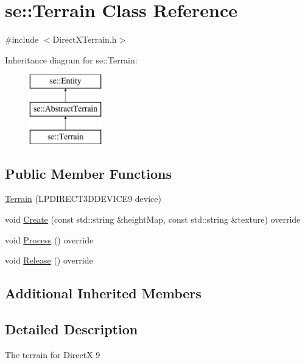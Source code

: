 \hypertarget{classse_1_1_terrain}{}\section{se\+:\+:Terrain Class Reference}
\label{classse_1_1_terrain}


{\ttfamily \#include $<$Direct\+X\+Terrain.\+h$>$}

Inheritance diagram for se\+:\+:Terrain\+:\begin{figure}[H]
\begin{center}
\leavevmode
\includegraphics[height=3.000000cm]{classse_1_1_terrain}
\end{center}
\end{figure}
\subsection*{Public Member Functions}
\begin{DoxyCompactItemize}
\item 
\mbox{\hyperlink{classse_1_1_terrain_aba0253655814ae0fab2b1145e2a4e3d2}{Terrain}} (L\+P\+D\+I\+R\+E\+C\+T3\+D\+D\+E\+V\+I\+C\+E9 device)
\item 
void \mbox{\hyperlink{classse_1_1_terrain_aa4faf6049af59a776a2464175e62ff08}{Create}} (const std\+::string \&height\+Map, const std\+::string \&texture) override
\item 
void \mbox{\hyperlink{classse_1_1_terrain_aa4eeb1886f46d2f33e1633b6f7c7345c}{Process}} () override
\item 
void \mbox{\hyperlink{classse_1_1_terrain_a61004e3426795d93190fe8d1f4159759}{Release}} () override
\end{DoxyCompactItemize}
\subsection*{Additional Inherited Members}


\subsection{Detailed Description}
The terrain for DirectX 9 

